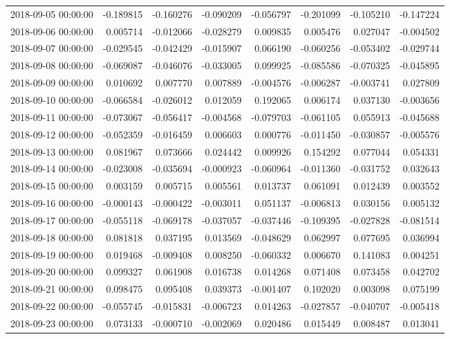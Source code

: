 \begin{tabular}{lrrrrrrr}
2018-09-05 00:00:00 & -0.189815 & -0.160276 & -0.090209 & -0.056797 & -0.201099 & -0.105210 & -0.147224 \\
2018-09-06 00:00:00 & 0.005714 & -0.012066 & -0.028279 & 0.009835 & 0.005476 & 0.027047 & -0.004502 \\
2018-09-07 00:00:00 & -0.029545 & -0.042429 & -0.015907 & 0.066190 & -0.060256 & -0.053402 & -0.029744 \\
2018-09-08 00:00:00 & -0.069087 & -0.046076 & -0.033005 & 0.099925 & -0.085586 & -0.070325 & -0.045895 \\
2018-09-09 00:00:00 & 0.010692 & 0.007770 & 0.007889 & -0.004576 & -0.006287 & -0.003741 & 0.027809 \\
2018-09-10 00:00:00 & -0.066584 & -0.026012 & 0.012059 & 0.192065 & 0.006174 & 0.037130 & -0.003656 \\
2018-09-11 00:00:00 & -0.073067 & -0.056417 & -0.004568 & -0.079703 & -0.061105 & 0.055913 & -0.045688 \\
2018-09-12 00:00:00 & -0.052359 & -0.016459 & 0.006603 & 0.000776 & -0.011450 & -0.030857 & -0.005576 \\
2018-09-13 00:00:00 & 0.081967 & 0.073666 & 0.024442 & 0.009926 & 0.154292 & 0.077044 & 0.054331 \\
2018-09-14 00:00:00 & -0.023008 & -0.035694 & -0.000923 & -0.060964 & -0.011360 & -0.031752 & 0.032643 \\
2018-09-15 00:00:00 & 0.003159 & 0.005715 & 0.005561 & 0.013737 & 0.061091 & 0.012439 & 0.003552 \\
2018-09-16 00:00:00 & -0.000143 & -0.000422 & -0.003011 & 0.051137 & -0.006813 & 0.030156 & 0.005132 \\
2018-09-17 00:00:00 & -0.055118 & -0.069178 & -0.037057 & -0.037446 & -0.109395 & -0.027828 & -0.081514 \\
2018-09-18 00:00:00 & 0.081818 & 0.037195 & 0.013569 & -0.048629 & 0.062997 & 0.077695 & 0.036994 \\
2018-09-19 00:00:00 & 0.019468 & -0.009408 & 0.008250 & -0.060332 & 0.006670 & 0.141083 & 0.004251 \\
2018-09-20 00:00:00 & 0.099327 & 0.061908 & 0.016738 & 0.014268 & 0.071408 & 0.073458 & 0.042702 \\
2018-09-21 00:00:00 & 0.098475 & 0.095408 & 0.039373 & -0.001407 & 0.102020 & 0.003098 & 0.075199 \\
2018-09-22 00:00:00 & -0.055745 & -0.015831 & -0.006723 & 0.014263 & -0.027857 & -0.040707 & -0.005418 \\
2018-09-23 00:00:00 & 0.073133 & -0.000710 & -0.002069 & 0.020486 & 0.015449 & 0.008487 & 0.013041 \\

\end{tabular}

